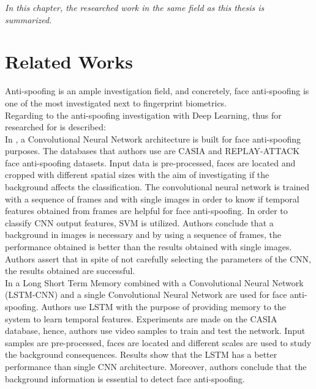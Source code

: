 
\begin{small}
\emph{In this chapter, the researched work in the same field as this thesis is summarized.}
\end{small}

\section{Related Works}
Anti-spoofing is an ample investigation field, and concretely, face anti-spoofing is one of the most investigated next to fingerprint biometrics.\\

Regarding to the anti-spoofing investigation with Deep Learning, thus for researched for is described:\\

In \cite{yangLL14}, a Convolutional Neural Network architecture is built for face anti-spoofing purposes.  The databases that authors use are CASIA and REPLAY-ATTACK face anti-spoofing datasets. Input data is pre-processed, faces are located and cropped with different spatial sizes with the aim of investigating if the background affects the classification. The convolutional neural network is trained with a sequence of frames and with single images in order to know if temporal features obtained from frames are helpful for face anti-spoofing. In order to classify CNN output features, SVM is utilized. Authors conclude that a background in images is necessary and by using a sequence of frames, the performance obtained is better than the results obtained with single images. Authors assert that in spite of not carefully selecting the parameters of the CNN, the results obtained are successful. \\

In \cite{LSTM-CNN} a Long Short Term Memory combined with a Convolutional Neural Network (LSTM-CNN) and a single Convolutional Neural Network are used for face anti-spoofing. Authors use LSTM with the purpose of providing memory to the system to learn temporal features. Experiments are made on the CASIA database, hence, authors use video samples to train and test the network. Input samples are pre-processed, faces are located and different scales are used to study the background consequences. Results show that the LSTM has a better performance than single CNN architecture. Moreover, authors conclude that the background information is essential to detect face anti-spoofing.\\

